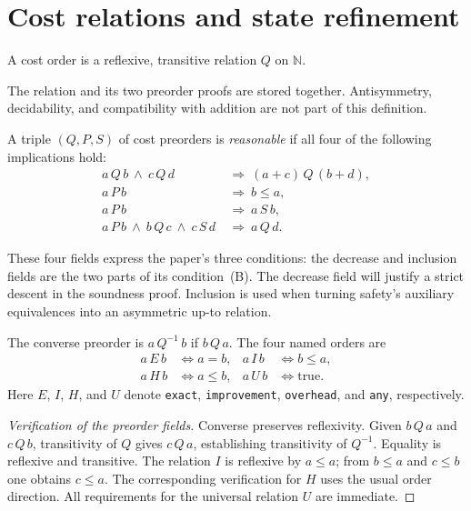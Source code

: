 \section{Cost relations and state refinement}

\begin{definition}\label{term:cost-preorder}
A cost order is a reflexive, transitive relation $Q$ on $\mathbb N$.
\end{definition}
The relation and its two preorder proofs are stored together. Antisymmetry,
decidability, and compatibility with addition are not part of this definition.

\begin{definition}\label{term:reasonable}
A triple $(Q,P,S)$ of cost preorders is \emph{reasonable} if all four of the
following implications hold:
\begin{align*}
 a\,Q\,b\ \land\ c\,Q\,d &\ \Longrightarrow\ (a+c)\,Q\,(b+d),\tag{addition}\\
 a\,P\,b &\ \Longrightarrow\ b\leq a,\tag{decrease}\\
 a\,P\,b &\ \Longrightarrow\ a\,S\,b,\tag{inclusion}\\
 a\,P\,b\ \land\ b\,Q\,c\ \land\ c\,S\,d
   &\ \Longrightarrow\ a\,Q\,d.\tag{sandwich}
\end{align*}
\end{definition}
These four fields express the paper's three conditions: the decrease and
inclusion fields are the two parts of its condition~(B). The decrease field
will justify a strict descent in the soundness proof. Inclusion is used when
turning safety's auxiliary equivalences into an asymmetric up-to relation.

\begin{definition}\label{term:cost-orders}
The converse preorder is $a\,Q^{-1}\,b$ if $b\,Q\,a$. The four named
orders are
\[
 \begin{aligned}
 a\,E\,b &\iff a=b,&
 a\,I\,b &\iff b\leq a,\\
 a\,H\,b &\iff a\leq b,&
 a\,U\,b &\iff \text{true}.
 \end{aligned}
\]
Here $E$, $I$, $H$, and $U$ denote \texttt{exact}, \texttt{improvement},
\texttt{overhead}, and \texttt{any}, respectively.
\end{definition}
\begin{proof}[Verification of the preorder fields]
Converse preserves reflexivity. Given $b\,Q\,a$ and $c\,Q\,b$,
transitivity of $Q$ gives $c\,Q\,a$, establishing transitivity of
$Q^{-1}$. Equality is reflexive and transitive. The relation $I$ is
reflexive by $a\leq a$; from $b\leq a$ and $c\leq b$ one obtains
$c\leq a$. The corresponding verification for $H$ uses the usual order
direction. All requirements for the universal relation $U$ are immediate.
\end{proof}

